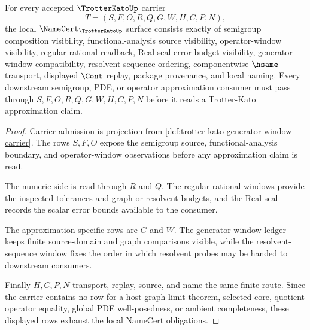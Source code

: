 \begin{theorem}
\label{thm:trotter-kato-generator-window-namecert-obligations}
For every accepted $\TrotterKatoUp$ carrier
$$
T=(S,F,O,R,Q,G,W,H,C,P,N),
$$
the local $\NameCert_{\TrotterKatoUp}$ surface consists exactly of semigroup composition visibility, functional-analysis source visibility, operator-window visibility, regular rational readback, Real-seal error-budget visibility, generator-window compatibility, resolvent-sequence ordering, componentwise $\hsame$ transport, displayed $\Cont$ replay, package provenance, and local naming. Every downstream semigroup, PDE, or operator approximation consumer must pass through $S,F,O,R,Q,G,W,H,C,P,N$ before it reads a Trotter-Kato approximation claim.
\end{theorem}
\begin{proof}
Carrier admission is projection from \autoref{def:trotter-kato-generator-window-carrier}. The rows $S,F,O$ expose the semigroup source, functional-analysis boundary, and operator-window observations before any approximation claim is read.

The numeric side is read through $R$ and $Q$. The regular rational windows provide the inspected tolerances and graph or resolvent budgets, and the Real seal records the scalar error bounds available to the consumer.

The approximation-specific rows are $G$ and $W$. The generator-window ledger keeps finite source-domain and graph comparisons visible, while the resolvent-sequence window fixes the order in which resolvent probes may be handed to downstream consumers.

Finally $H,C,P,N$ transport, replay, source, and name the same finite route. Since the carrier contains no row for a host graph-limit theorem, selected core, quotient operator equality, global PDE well-posedness, or ambient completeness, these displayed rows exhaust the local NameCert obligations.
\end{proof}

